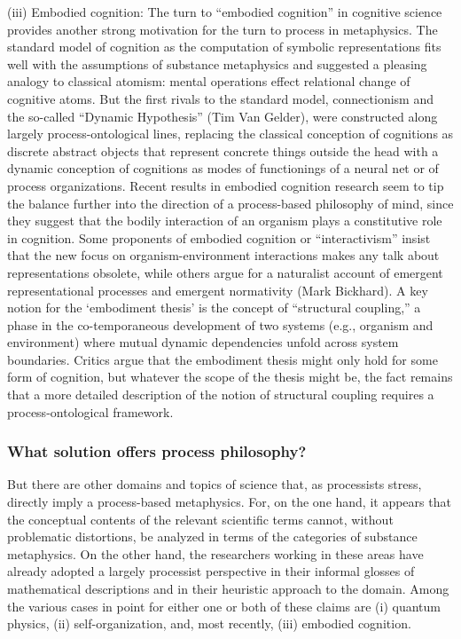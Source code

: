 (iii) Embodied cognition: The turn to “embodied cognition” in cognitive science provides another strong motivation for the turn to process in metaphysics. The standard model of cognition as the computation of symbolic representations fits well with the assumptions of substance metaphysics and suggested a pleasing analogy to classical atomism: mental operations effect relational change of cognitive atoms. But the first rivals to the standard model, connectionism and the so-called “Dynamic Hypothesis” (Tim Van Gelder), were constructed along largely process-ontological lines, replacing the classical conception of cognitions as discrete abstract objects that represent concrete things outside the head with a dynamic conception of cognitions as modes of functionings of a neural net or of process organizations. Recent results in embodied cognition research seem to tip the balance further into the direction of a process-based philosophy of mind, since they suggest that the bodily interaction of an organism plays a constitutive role in cognition. Some proponents of embodied cognition or “interactivism” insist that the new focus on organism-environment interactions makes any talk about representations obsolete, while others argue for a naturalist account of emergent representational processes and emergent normativity (Mark Bickhard). A key notion for the ‘embodiment thesis’ is the concept of “structural coupling,” a phase in the co-temporaneous development of two systems (e.g., organism and environment) where mutual dynamic dependencies unfold across system boundaries. Critics argue that the embodiment thesis might only hold for some form of cognition, but whatever the scope of the thesis might be, the fact remains that a more detailed description of the notion of structural coupling requires a process-ontological framework.

\subsubsection{What solution offers process philosophy?}
But there are other domains and topics of science that, as processists stress, directly imply a process-based metaphysics. For, on the one hand, it appears that the conceptual contents of the relevant scientific terms cannot, without problematic distortions, be analyzed in terms of the categories of substance metaphysics. On the other hand, the researchers working in these areas have already adopted a largely processist perspective in their informal glosses of mathematical descriptions and in their heuristic approach to the domain. Among the various cases in point for either one or both of these claims are (i) quantum physics, (ii) self-organization, and, most recently, (iii) embodied cognition.

